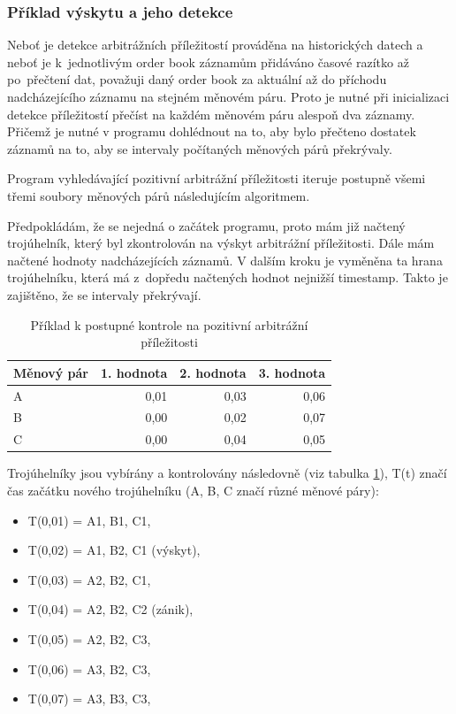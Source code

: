 \documentclass[thesis=B,czech]{FITthesis}[2019/03/21]
\begin{document}
\subsubsection{Příklad výskytu a jeho detekce}
Neboť je detekce arbitrážních příležitostí prováděna na historických datech a neboť je k~jednotlivým order book záznamům přidáváno časové razítko až po~přečtení dat, považuji daný order book za aktuální až do příchodu nadcházejícího záznamu na stejném měnovém páru. Proto je nutné při inicializaci detekce příležitostí přečíst na každém měnovém páru alespoň dva záznamy. Přičemž je nutné v programu dohlédnout na to, aby bylo přečteno dostatek záznamů na to, aby se intervaly počítaných měnových párů překrývaly. 

Program vyhledávající pozitivní arbitrážní příležitosti iteruje postupně všemi třemi soubory měnových párů následujícím algoritmem. 

Předpokládám, že se nejedná o začátek programu, proto mám již načtený trojúhelník, který byl zkontrolován na výskyt arbitrážní příležitosti. Dále mám načtené hodnoty nadcházejících záznamů. V dalším kroku je vyměněna ta hrana trojúhelníku, která má z~dopředu načtených hodnot nejnižší timestamp. Takto je zajištěno, že se intervaly překrývají. 

\begin{table}\centering
\caption{Příklad k postupné kontrole na pozitivní arbitrážní příležitosti}
\label{timestamp_example}
\begin{tabular}{|| l | r | r | r ||}\hline Měnový pár & 1. hodnota & 2. hodnota & 3. hodnota\\ [0.5ex]
 \hline
 \hline A & 0,01 & 0,03 & 0,06\\ 
 \hline B & 0,00 & 0,02 & 0,07\\ 
 \hline C & 0,00 & 0,04 & 0,05\\ 
 \hline
\end{tabular}
\end{table}

Trojúhelníky jsou vybírány a kontrolovány následovně (viz tabulka \ref{timestamp_example}), T(t) značí čas začátku nového trojúhelníku (A, B, C značí různé měnové páry):
\begin{itemize}
    \item T(0,01) = A1, B1, C1,
    \item T(0,02) = A1, B2, C1 (výskyt),
    \item T(0,03) = A2, B2, C1,
    \item T(0,04) = A2, B2, C2 (zánik),
    \item T(0,05) = A2, B2, C3,
    \item T(0,06) = A3, B2, C3,
    \item T(0,07) = A3, B3, C3,
\end{itemize}
\end{document}
